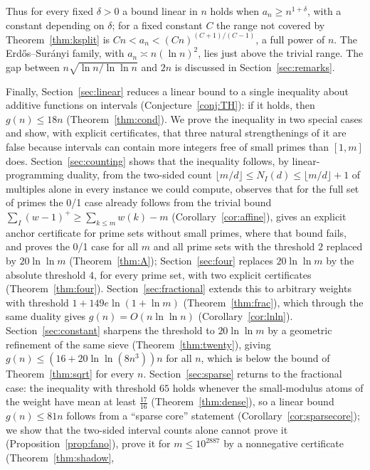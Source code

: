 \documentclass[11pt]{article}
\theoremstyle{definition}
\begin{document}
Thus for every fixed $\delta>0$ a bound linear in $n$ holds when $a_n\ge n^{1+\delta}$, with a constant depending on
$\delta$; for a fixed constant $C$ the range not covered by Theorem~\ref{thm:ksplit} is $Cn<a_n<(Cn)^{(C+1)/(C-1)}$,
a full power of $n$. The Erd\H{o}s--Sur\'anyi family, with $a_n\asymp n(\ln n)^2$, lies just above the trivial range.
The gap between $n\sqrt{\ln n/\ln\ln n}$ and $2n$ is discussed in Section~\ref{sec:remarks}.

Finally, Section~\ref{sec:linear} reduces a linear bound to a single inequality about additive functions on
intervals (Conjecture~\ref{conj:TH}): if it holds, then $g(n)\le18n$ (Theorem~\ref{thm:cond}). We prove the
inequality in two special cases and show, with explicit certificates, that three natural strengthenings of it are
false because intervals can contain more integers free of small primes than $[1,m]$ does. Section~\ref{sec:counting} shows that the inequality follows, by linear-programming duality, from
the two-sided count $\lfloor m/d\rfloor\le N_I(d)\le\lfloor m/d\rfloor+1$ of multiples alone in every instance we could compute,
observes that for the full set of primes the 0/1 case already follows from the trivial bound
$\sum_I(w-1)^+\ge\sum_{k\le m}w(k)-m$ (Corollary~\ref{cor:affine}), gives an explicit anchor certificate for prime sets without small
primes, where that bound fails, and proves the 0/1 case for all $m$ and all prime sets with the threshold $2$ replaced by $20\ln\ln m$
(Theorem~\ref{thm:A}); Section~\ref{sec:four} replaces $20\ln\ln m$ by the absolute threshold $4$, for every prime set, with two
explicit certificates (Theorem~\ref{thm:four}). Section~\ref{sec:fractional} extends this to arbitrary weights
with threshold $1+149e\ln(1+\ln m)$ (Theorem~\ref{thm:frac}), which through the same duality gives
$g(n)=O(n\ln\ln n)$ (Corollary~\ref{cor:lnln}). Section~\ref{sec:constant} sharpens the threshold to $20\ln\ln m$ by a geometric
refinement of the same sieve (Theorem~\ref{thm:twenty}), giving $g(n)\le(16+20\ln\ln(8n^3))n$ for all $n$, which is below the
bound of Theorem~\ref{thm:sqrt} for every $n$. Section~\ref{sec:sparse} returns to the fractional case: the inequality with threshold $65$
holds whenever the small-modulus atoms of the weight have mean at least $\tfrac{17}{16}$ (Theorem~\ref{thm:dense}), so a linear bound
$g(n)\le81n$ follows from a ``sparse core'' statement (Corollary~\ref{cor:sparsecore}); we show that the two-sided interval counts alone
cannot prove it (Proposition~\ref{prop:fano}), prove it for $m\le10^{2887}$ by a nonnegative certificate (Theorem~\ref{thm:shadow},
\end{document}
